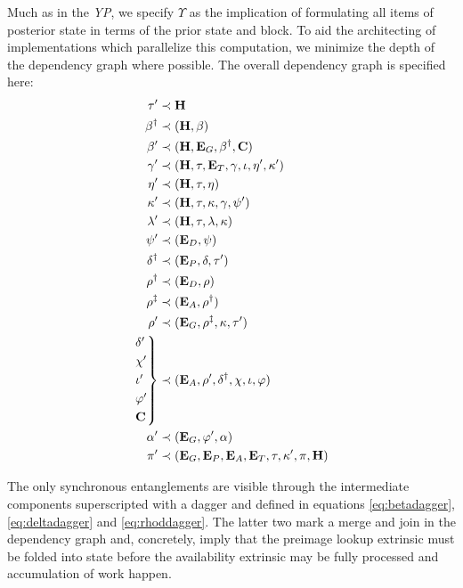 Much as in the \emph{YP}, we specify $\Upsilon$ as the implication of formulating all items of posterior state in terms of the prior state and block. To aid the architecting of implementations which parallelize this computation, we minimize the depth of the dependency graph where possible. The overall dependency graph is specified here:
\begin{align}\label{eq:transitionfunctioncomposition}
  \tau' &\prec \mathbf{H} \\
  \beta^\dagger &\prec (\mathbf{H}, \beta) \label{eq:betadagger} \\
  \beta' &\prec (\mathbf{H}, \xtguarantees, \beta^\dagger, \mathbf{C}) \\
  \gamma' &\prec (\mathbf{H}, \tau, \xttickets, \gamma, \iota, \eta', \kappa') \\
  \eta' &\prec (\mathbf{H}, \tau, \eta) \\
  \kappa' &\prec (\mathbf{H}, \tau, \kappa, \gamma, \psi') \\
  \lambda' &\prec (\mathbf{H}, \tau, \lambda, \kappa) \\
  \psi' &\prec (\xtdisputes, \psi) \\
  \delta^\dagger &\prec (\xtpreimages, \delta, \tau') \label{eq:deltadagger} \\
  \rho^\dagger &\prec (\xtdisputes, \rho) \label{eq:rhodagger} \\
  \rho^\ddagger &\prec (\xtassurances, \rho^\dagger) \label{eq:rhoddagger} \\
  \rho' &\prec (\xtguarantees, \rho^\ddagger, \kappa, \tau') \\
  \begin{rcases*}
    \delta' \\
    \chi' \\
    \iota' \\
    \varphi' \\
    \mathbf{C}
  \end{rcases*} &\prec (\xtassurances, \rho', \delta^\dagger, \chi, \iota, \varphi) \\
  \alpha' &\prec (\xtguarantees, \varphi', \alpha) \\
  \pi' &\prec (\xtguarantees, \xtpreimages, \xtassurances, \xttickets, \tau, \kappa', \pi, \mathbf{H})
\end{align}

The only synchronous entanglements are visible through the intermediate components superscripted with a dagger and defined in equations \ref{eq:betadagger}, \ref{eq:deltadagger} and \ref{eq:rhoddagger}. The latter two mark a merge and join in the dependency graph and, concretely, imply that the preimage lookup extrinsic must be folded into state before the availability extrinsic may be fully processed and accumulation of work happen.

